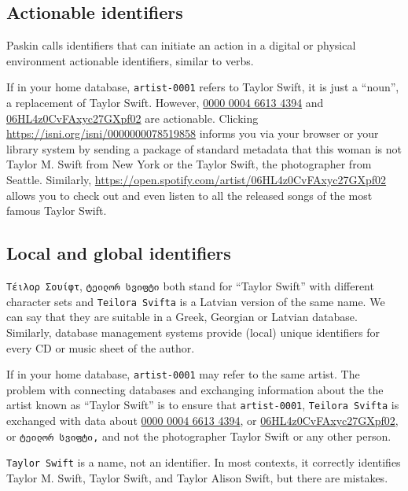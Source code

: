 \documentclass[
  letterpaper,
  DIV=11,
  numbers=noendperiod]{scrreprt}
\begin{document}
\subsection{Actionable identifiers}\label{actionable-identifiers}

Paskin calls identifiers that can initiate an action in a digital or
physical environment actionable identifiers, similar to verbs.

If in your home database, \texttt{artist-0001} refers to Taylor Swift,
it is just a ``noun'', a replacement of Taylor Swift. However,
\href{https://isni.org/isni/0000000078519858}{0000 0004 6613 4394} and
\href{https://open.spotify.com/artist/06HL4z0CvFAxyc27GXpf02}{06HL4z0CvFAxyc27GXpf02}
are actionable. Clicking \url{https://isni.org/isni/0000000078519858}
informs you via your browser or your library system by sending a package
of standard metadata that this woman is not Taylor M. Swift from New
York or the Taylor Swift, the photographer from Seattle. Similarly,
\url{https://open.spotify.com/artist/06HL4z0CvFAxyc27GXpf02} allows you
to check out and even listen to all the released songs of the most
famous Taylor Swift.

\subsection{Local and global
identifiers}\label{local-and-global-identifiers}

\texttt{Τέιλορ\ Σουίφτ}, \texttt{ტეილორ\ სვიფტი} both stand for ``Taylor
Swift'' with different character sets and \texttt{Teilora\ Svifta} is a
Latvian version of the same name. We can say that they are suitable in a
Greek, Georgian or Latvian database. Similarly, database management
systems provide (local) unique identifiers for every CD or music sheet
of the author.

If in your home database, \texttt{artist-0001} may refer to the same
artist. The problem with connecting databases and exchanging information
about the the artist known as ``Taylor Swift'' is to ensure that
\texttt{artist-0001}, \texttt{Teilora\ Svifta} is exchanged with data
about \href{https://isni.org/isni/0000000078519858}{0000 0004 6613
4394}, or
\href{https://open.spotify.com/artist/06HL4z0CvFAxyc27GXpf02}{06HL4z0CvFAxyc27GXpf02},
or \texttt{ტეილორ\ სვიფტი,} and not the photographer Taylor Swift or any
other person.

\texttt{Taylor\ Swift} is a name, not an identifier. In most contexts,
it correctly identifies Taylor M. Swift, Taylor Swift, and Taylor Alison
Swift, but there are mistakes.
\end{document}
